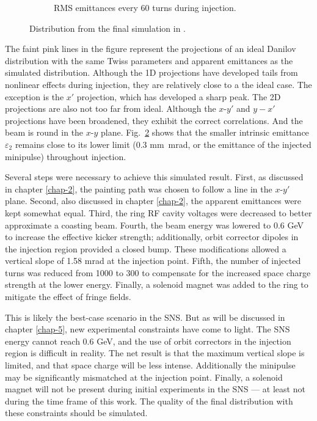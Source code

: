 \begin{figure}[!p]
\begin{subfigure}{0.5\textwidth}
        \caption{RMS emittances every 60 turns during injection.}
        \label{fig:Holmes_emittances}
    \end{subfigure}
    \caption{Distribution from the final simulation in \cite{Holmes2018}.}
\end{figure}
%
The faint pink lines in the figure represent the projections of an ideal Danilov distribution with the same Twiss parameters and apparent emittances as the simulated distribution. Although the 1D projections have developed tails from nonlinear effects during injection, they are relatively close to a the ideal case. The exception is the $x'$ projection, which has developed a sharp peak. The 2D projections are also not too far from ideal. Although the $x$-$y'$ and $y-x'$ projections have been broadened, they exhibit the correct correlations. And the beam is round in the $x$-$y$ plane. Fig.~\ref{fig:Holmes_emittances} shows that the smaller intrinsic emittance $\varepsilon_2$ remains close to its lower limit (0.3 mm~mrad, or the emittance of the injected minipulse) throughout injection. 

Several steps were necessary to achieve this simulated result. First, as discussed in chapter \ref{chap-2}, the painting path was chosen to follow a line in the $x$-$y'$ plane. Second, also discussed in chapter \ref{chap-2}, the apparent emittances were kept somewhat equal. Third, the ring RF cavity voltages were decreased to better approximate a coasting beam. Fourth, the beam energy was lowered to 0.6 GeV to increase the effective kicker strength; additionally, orbit corrector dipoles in the injection region provided a closed bump. These modifications allowed a vertical slope of 1.58 mrad at the injection point. Fifth, the number of injected turns was reduced from 1000 to 300 to compensate for the increased space charge strength at the lower energy. Finally, a solenoid magnet was added to the ring to mitigate the effect of fringe fields. 

This is likely the best-case scenario in the SNS. But as will be discussed in chapter \ref{chap-5}, new experimental constraints have come to light. The SNS energy cannot reach 0.6 GeV, and the use of orbit correctors in the injection region is difficult in reality. The net result is that the maximum vertical slope is limited, and that space charge will be less intense. Additionally the minipulse may be significantly mismatched at the injection point. Finally, a solenoid magnet will not be present during initial experiments in the SNS — at least not during the time frame of this work. The quality of the final distribution with these constraints should be simulated.

